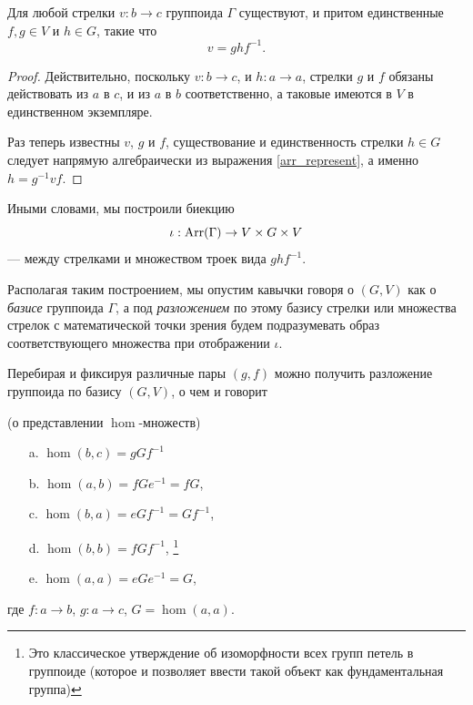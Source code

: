     \begin{lemma}\label{lm_1} Для любой стрелки $v : b \to c$ группоида 
        $\Gamma$ существуют, и притом единственные $f,g \in V$ и $h \in G$, 
        такие что
            \begin{equation}\label{arr_represent}
                v = ghf^{-1}.
            \end{equation}
    \end{lemma}
    \begin{proof}
        Действительно, поскольку $v : b \to c$, и $h : a \to a$, стрелки $g$ и 
        $f$ обязаны действовать из $a$ в $c$, и из $a$ в $b$ соответственно, а 
        таковые имеются в $V$ в единственном экземпляре.
        
        Раз теперь известны $v$, $g$ и $f$, существование и единственность 
        стрелки $h \in G$ следует напрямую алгебраически из выражения 
        \eqref{arr_represent}, а именно $h = g^{-1}vf$.
    \end{proof}
    
    Иными словами, мы построили биекцию 
    \begin{equation}\label{iota}
        \iota : \operatorname*{Arr}(\Gamma) \to V \times G \times V
    \end{equation}
     --- между стрелками и множеством троек вида $ghf^{-1}$.

    Располагая таким построением, мы опустим кавычки говоря о $(G,V)$ как о 
    \emph{базисе} группоида $\Gamma$, а под \emph{разложением} по этому базису 
    стрелки или множества стрелок с математической точки зрения будем 
    подразумевать образ соответствующего множества при отображении $\iota$.

    Перебирая и фиксируя различные пары $(g,f)$ можно получить разложение 
    группоида по базису $(G, V)$, о чем и говорит
    
    \begin{corollary}\label{cor_repres} (о представлении $\hom$-множеств)
        \begin{itemize}
            \item[a.] $\hom(b,c) = gGf^{-1}$
            \item[b.] $\hom(a,b) = fGe^{-1} = fG$,
            \item[c.] $\hom(b,a) = eGf^{-1} = Gf^{-1}$,
            \item[d.] $\hom(b,b) = fGf^{-1}$, \footnote{Это классическое 
            утверждение об изоморфности всех групп петель в группоиде (которое 
            и позволяет ввести такой объект как фундаментальная группа)}
            \item[e.] $\hom(a,a) = eGe^{-1} = G$,
        \end{itemize}
        где $f : a \to b$, $g : a \to c$, $G = \hom(a,a)$.
    \end{corollary}

